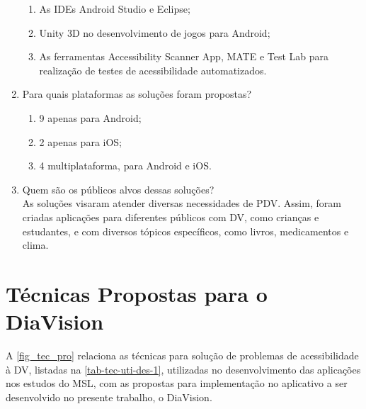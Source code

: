 \begin{enumerate}
\begin{enumerate}
                  \item As IDEs Android Studio e Eclipse;
                  \item Unity 3D no desenvolvimento de jogos para Android;
                  \item As ferramentas Accessibility Scanner App, MATE e Test Lab para realização de testes de acessibilidade automatizados.
            \end{enumerate}
      \item Para quais plataformas as soluções foram propostas?
            \begin{enumerate}
                  \item 9 apenas para Android;
                  \item 2 apenas para iOS\@;
                  \item 4 multiplataforma, para Android e iOS\@.
            \end{enumerate}
      \item Quem são os públicos alvos dessas soluções? \\
            As soluções visaram atender diversas necessidades de PDV\@.
            Assim, foram criadas aplicações para diferentes públicos com DV,
            como crianças e estudantes, e com diversos tópicos específicos,
            como livros, medicamentos e clima.
\end{enumerate}

\section{Técnicas Propostas para o DiaVision}

A \autoref{fig_tec_pro} relaciona as técnicas para solução de problemas de acessibilidade à DV, listadas na \autoref{tab-tec-uti-des-1},
utilizadas no desenvolvimento das aplicações nos estudos do MSL, com as propostas para implementação no aplicativo
a ser desenvolvido no presente trabalho, o DiaVision.

